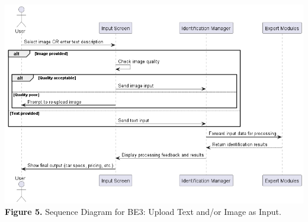 \documentclass[]{article}
\begin{document}
\begin{center}
	\includegraphics[scale=0.55]{Sequence Diagrams/BE3_Sequence_Diagram.png}\\
	\textbf{Figure 5.} Sequence Diagram for BE3: Upload Text and/or Image as Input.\\


\end{center}
\end{document}
